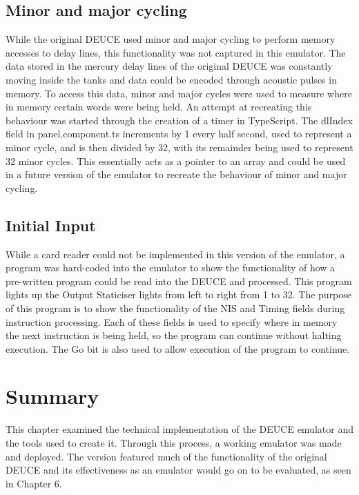 \documentclass{l4proj}
\begin{document}
\subsection{Minor and major cycling}
While the original DEUCE used minor and major cycling to perform memory accesses to delay lines, this functionality was not captured in this emulator. The data stored in the mercury delay lines of the original DEUCE was constantly moving inside the tanks and data could be encoded through acoustic pulses in memory. To access this data, minor and major cycles were used to measure where in memory certain words were being held. An attempt at recreating this behaviour was started through the creation of a timer in TypeScript. The dlIndex field in panel.component.ts increments by 1 every half second, used to represent a minor cycle, and is then divided by 32, with its remainder being used to represent 32 minor cycles. This essentially acts as a pointer to an array and could be used in a future version of the emulator to recreate the behaviour of minor and major cycling.

\subsection{Initial Input}
While a card reader could not be implemented in this version of the emulator, a program was hard-coded into the emulator to show the functionality of how a pre-written program could be read into the DEUCE and processed. This program lights up the Output Staticiser lights from left to right from 1 to 32. The purpose of this program is to show the functionality of the NIS and Timing fields during instruction processing. Each of these fields is used to specify where in memory the next instruction is being held, so the program can continue without halting execution. The Go bit is also used to allow execution of the program to continue.

\section{Summary}
This chapter examined the technical implementation of the DEUCE emulator and the tools used to create it. Through this process, a working emulator was made and deployed. The version featured much of the functionality of the original DEUCE and its effectiveness as an emulator would go on to be evaluated, as seen in Chapter 6.

\end{document}
